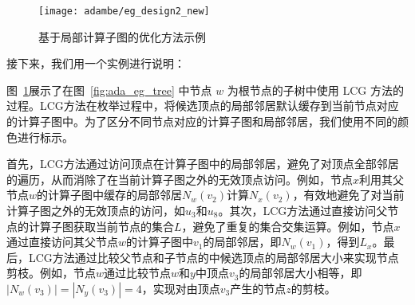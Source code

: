 \begin{figure} [t]
	\centering

	\texttt{[image: adambe/eg\_design2\_new]}

	\caption{基于局部计算子图的优化方法示例}

	\label{fig:ada_design2}
\end{figure}

接下来，我们用一个实例进行说明：

\begin{example}
	图~\ref{fig:ada_design2}展示了在图~\ref{fig:ada_eg_tree} 中节点 $w$ 为根节点的子树中使用 LCG 方法的过程。LCG方法在枚举过程中，将候选顶点的局部邻居默认缓存到当前节点对应的计算子图中。为了区分不同节点对应的计算子图和局部邻居，我们使用不同的颜色进行标示。

	首先，LCG方法通过访问顶点在计算子图中的局部邻居，避免了对顶点全部邻居的遍历，从而消除了在当前计算子图之外的无效顶点访问。例如，节点$x$利用其父节点$w$的计算子图中缓存的局部邻居$N_w(v_2)$计算$N_x(v_2)$，有效地避免了对当前计算子图之外的无效顶点的访问，如$u_3$和$u_8$。其次，LCG方法通过直接访问父节点的计算子图获取当前节点的集合$L$，避免了重复的集合交集运算。例如，节点$x$通过直接访问其父节点$w$的计算子图中$v_1$的局部邻居，即$N_w(v_1)$，得到$L_x$。最后，LCG方法通过比较父节点和子节点的中候选顶点的局部邻居大小来实现节点剪枝。例如，节点$w$通过比较节点$w$和$y$中顶点$v_3$的局部邻居大小相等，即$|N_w(v_3)| = |N_y(v_3)| = 4$，实现对由顶点$v_3$产生的节点$z$的剪枝。
	



		








\end{example}
